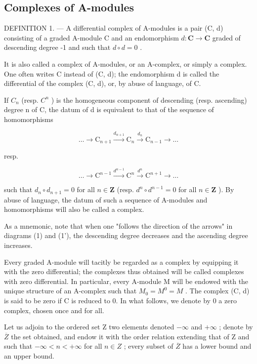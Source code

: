 \subsection{Complexes of A-modules}

DEFINITION 1. --- A differential complex of A-modules is a pair (C, d) consisting of a graded A-module C and an endomorphism \(d: \mathbf{C} \to \mathbf{C}\) graded of descending degree -1 and such that \(d \circ d = 0\) .

It is also called a complex of A-modules, or an A-complex, or simply a complex. One often writes C instead of (C, d); the endomorphism d is called the differential of the complex (C, d), or, by abuse of language, of C.

If \(C_{n}\) (resp. \(C^{n}\) ) is the homogeneous component of descending (resp. ascending) degree n of C, the datum of d is equivalent to that of the sequence of homomorphisms

\[
\dots \longrightarrow \mathrm{C} _ {n + 1} \xrightarrow {d _ {n + 1}} \mathrm{C} _ {n} \xrightarrow {d _ {n}} \mathrm{C} _ {n - 1} \longrightarrow \dots\tag{1}
\]

resp.

\[
\dots \longrightarrow \mathrm{C} ^ {n - 1} \xrightarrow {d ^ {n - 1}} \mathrm{C} ^ {n} \xrightarrow {d ^ {n}} \mathrm{C} ^ {n + 1} \longrightarrow \dots\tag{1'}
\]

such that \(d_n \circ d_{n+1} = 0\) for all \(n \in \mathbf{Z}\) (resp. \(d^n \circ d^{n-1} = 0\) for all \(n \in \mathbf{Z}\) ). By abuse of language, the datum of such a sequence of A-modules and homomorphisms will also be called a complex.

As a mnemonic, note that when one "follows the direction of the arrows" in diagrams (1) and (1'), the descending degree decreases and the ascending degree increases.

Every graded A-module will tacitly be regarded as a complex by equipping it with the zero differential; the complexes thus obtained will be called complexes with zero differential. In particular, every A-module M will be endowed with the unique structure of an A-complex such that \(M_{0} = M^{0} = M\) . The complex (C, d) is said to be zero if C is reduced to 0. In what follows, we denote by 0 a zero complex, chosen once and for all.

Let us adjoin to the ordered set Z two elements denoted \(-\infty\) and \(+\infty\) ; denote by \(\overline{Z}\) the set obtained, and endow it with the order relation extending that of Z and such that \(-\infty < n < +\infty\) for all \(n \in Z\) ; every subset of \(\overline{Z}\) has a lower bound and an upper bound.

